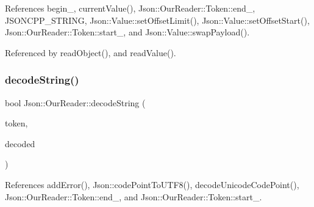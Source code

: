 References begin\+\_\+, current\+Value(), Json\+::\+Our\+Reader\+::\+Token\+::end\+\_\+, J\+S\+O\+N\+C\+P\+P\+\_\+\+S\+T\+R\+I\+NG, Json\+::\+Value\+::set\+Offset\+Limit(), Json\+::\+Value\+::set\+Offset\+Start(), Json\+::\+Our\+Reader\+::\+Token\+::start\+\_\+, and Json\+::\+Value\+::swap\+Payload().



Referenced by read\+Object(), and read\+Value().

\mbox{\label{classJson_1_1OurReader_a5046dfa5d43b1770a091aac0a63a9f4b_a5046dfa5d43b1770a091aac0a63a9f4b}} 
\subsubsection{\texorpdfstring{decode\+String()}{decodeString()}\hspace{0.1cm}{\footnotesize\ttfamily [2/2]}}
{\footnotesize\ttfamily bool Json\+::\+Our\+Reader\+::decode\+String (\begin{DoxyParamCaption}\item[{\hyperlink{classJson_1_1OurReader_1_1Token}{Token} \&}]{token,  }\item[{\hyperlink{json_8h_a1e723f95759de062585bc4a8fd3fa4be_a1e723f95759de062585bc4a8fd3fa4be}{J\+S\+O\+N\+C\+P\+P\+\_\+\+S\+T\+R\+I\+NG} \&}]{decoded }\end{DoxyParamCaption})\hspace{0.3cm}{\ttfamily [private]}}



References add\+Error(), Json\+::code\+Point\+To\+U\+T\+F8(), decode\+Unicode\+Code\+Point(), Json\+::\+Our\+Reader\+::\+Token\+::end\+\_\+, and Json\+::\+Our\+Reader\+::\+Token\+::start\+\_\+.

\mbox{\label{classJson_1_1OurReader_ac1bf03c161ece082e48da450c50f528d_ac1bf03c161ece082e48da450c50f528d}} 
